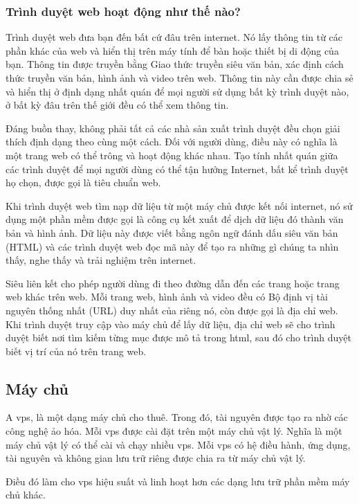 \subsubsection{Trình duyệt web hoạt động như thế nào?}
Trình duyệt web đưa bạn đến bất cứ đâu trên internet. Nó lấy thông tin từ các phần khác của web và hiển thị trên máy tính để bàn hoặc thiết bị di động của bạn. Thông tin được truyền bằng Giao thức truyền siêu văn bản, xác định cách thức truyền văn bản, hình ảnh và video trên web. Thông tin này cần được chia sẻ và hiển thị ở định dạng nhất quán để mọi người sử dụng bất kỳ trình duyệt nào, ở bất kỳ đâu trên thế giới đều có thể xem thông tin.

Đáng buồn thay, không phải tất cả các nhà sản xuất trình duyệt đều chọn giải thích định dạng theo cùng một cách. Đối với người dùng, điều này có nghĩa là một trang web có thể trông và hoạt động khác nhau. Tạo tính nhất quán giữa các trình duyệt để mọi người dùng có thể tận hưởng Internet, bất kể trình duyệt họ chọn, được gọi là tiêu chuẩn web.

Khi trình duyệt web tìm nạp dữ liệu từ một máy chủ được kết nối internet, nó sử dụng một phần mềm được gọi là công cụ kết xuất để dịch dữ liệu đó thành văn bản và hình ảnh. Dữ liệu này được viết bằng ngôn ngữ đánh dấu siêu văn bản (HTML) và các trình duyệt web đọc mã này để tạo ra những gì chúng ta nhìn thấy, nghe thấy và trải nghiệm trên internet.

Siêu liên kết cho phép người dùng đi theo đường dẫn đến các trang hoặc trang web khác trên web. Mỗi trang web, hình ảnh và video đều có Bộ định vị tài nguyên thống nhất (URL) duy nhất của riêng nó, còn được gọi là địa chỉ web. Khi trình duyệt truy cập vào máy chủ để lấy dữ liệu, địa chỉ web sẽ cho trình duyệt biết nơi tìm kiếm từng mục được mô tả trong html, sau đó cho trình duyệt biết vị trí của nó trên trang web.

\subsection{Máy chủ} \label{subsection:webserver}

A \acrshort{vps}, là một dạng máy chủ cho thuê. Trong đó, tài nguyên được tạo ra nhờ các công nghệ ảo hóa. Mỗi \acrshort{vps} được cài đặt trên một máy chủ vật lý. Nghĩa là một máy chủ vật lý có thể cài và chạy nhiều \acrshort{vps}. Mỗi \acrshort{vps} có hệ điều hành, ứng dụng, tài nguyên và không gian lưu trữ riêng được chia ra từ máy chủ vật lý.

Điều đó làm cho \acrshort{vps} hiệu suất và linh hoạt hơn các dạng lưu trữ phần mềm máy chủ khác.

